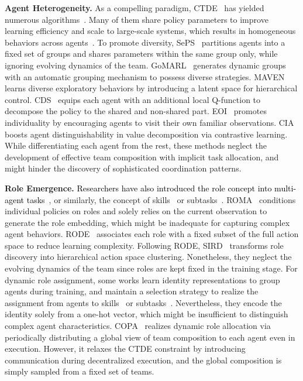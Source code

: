 \documentclass{article} %
\begin{document}
\textbf{Agent Heterogeneity.} 
As a compelling paradigm, CTDE~\citep{foerster2016learning} has yielded numerous algorithms~\citep{lowe2017multi,son2019qtran,wang2023more}.
Many of them share policy parameters to improve learning efficiency and scale to large-scale systems, which results in homogeneous behaviors across agents~\citep{liu2022heterogeneous}.
To promote diversity, SePS~\citep{christianos2021scaling} partitions agents into a fixed set of groups and shares parameters within the same group only, while ignoring evolving dynamics of the team.
GoMARL~\citep{zang2023automatic} generates dynamic groups with an automatic grouping mechanism to possess diverse strategies.
MAVEN~\citep{mahajan2019maven} learns diverse exploratory behaviors by introducing a latent space for hierarchical control.
CDS~\citep{li2021celebrating} equips each agent with an additional local Q-function to decompose the policy to the shared and non-shared part.
EOI~\citep{jiang2021emergence} promotes individuality by encouraging agents to visit their own familiar observations.
CIA~\citep{liu2023contrastive} boosts agent distinguishability in value decomposition via contrastive learning.
While differentiating each agent from the rest, these methods neglect the development of effective team composition with implicit task allocation, and might hinder the discovery of sophisticated coordination patterns.


\textbf{Role Emergence.} 
\textcolor{black}{Researchers have also introduced the role concept into multi-agent tasks~\citep{sims2008automated,lhaksmana2018role,xia2023dynamic,cao2023linda}}, or similarly, the concept of skills~\citep{yang2020hierarchical} or subtasks~\citep{yuan2022multi}.
ROMA~\citep{wang2020roma} conditions individual policies on roles and solely relies on the current observation to generate the role embedding, which might be inadequate for capturing complex agent behaviors.
RODE~\citep{wang2021rode} associates each role with a fixed subset of the full action space to reduce learning complexity.
Following RODE, SIRD~\citep{zeng2023effective} transforms role discovery into hierarchical action space clustering.
Nonetheless, they neglect the evolving dynamics of the team since roles are kept fixed in the training stage.
For dynamic role assignment, some works learn identity representations to group agents during training, and maintain a selection strategy to realize the assignment from agents to skills~\citep{liu2022heterogeneous} or subtasks~\citep{yang2022ldsa,iqbal2022alma}.
Nevertheless, they encode the identity solely from a one-hot vector, which might be insufficient to distinguish complex agent characteristics.
COPA~\citep{liu2021coach} realizes dynamic role allocation via periodically distributing a global view of team composition to each agent even in execution.
However, it relaxes the CTDE constraint by introducing communication during decentralized execution, and the global composition is simply sampled from a fixed set of teams.
\end{document}

